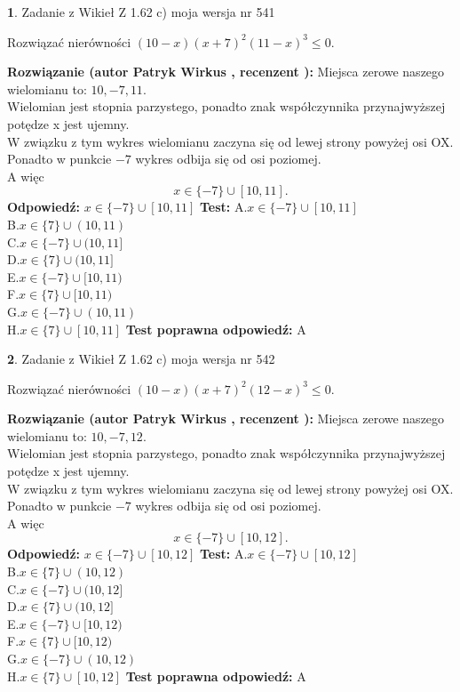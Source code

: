 \documentclass[12pt, a4paper]{article}
\theoremstyle{definition} %
\newtheorem{zad}{}
\newcommand{\zadStart}[1]{\begin{zad}#1\newline}
\newcommand{\zadStop}{\end{zad}}
\newcommand{\rozwStart}[2]{\noindent \textbf{Rozwiązanie (autor #1 , recenzent #2): }\newline}
\newcommand{\rozwStop}{\newline}
\newcommand{\odpStart}{\noindent \textbf{Odpowiedź:}\newline}
\newcommand{\odpStop}{\newline}
\newcommand{\testStart}{\noindent \textbf{Test:}\newline}
\newcommand{\testStop}{\newline}
\newcommand{\kluczStart}{\noindent \textbf{Test poprawna odpowiedź:}\newline}
\newcommand{\kluczStop}{\newline}
\begin{document}
\zadStart{Zadanie z Wikieł Z 1.62 c) moja wersja nr 541}

Rozwiązać nierówności $(10-x)(x+7)^{2}(11-x)^{3}\le0$.
\zadStop
\rozwStart{Patryk Wirkus}{}
Miejsca zerowe naszego wielomianu to: $10, -7, 11$.\\
Wielomian jest stopnia parzystego, ponadto znak współczynnika przy\linebreak najwyższej potędze x jest ujemny.\\ W związku z tym wykres wielomianu zaczyna się od lewej strony powyżej osi OX.\\
Ponadto w punkcie $-7$ wykres odbija się od osi poziomej.\\
A więc $$x \in \{-7\} \cup [10,11].$$
\rozwStop
\odpStart
$x \in \{-7\} \cup [10,11]$
\odpStop
\testStart
A.$x \in \{-7\} \cup [10,11]$\\
B.$x \in \{7\} \cup (10,11)$\\
C.$x \in \{-7\} \cup (10,11]$\\
D.$x \in \{7\} \cup (10,11]$\\
E.$x \in \{-7\} \cup [10,11)$\\
F.$x \in \{7\} \cup [10,11)$\\
G.$x \in \{-7\} \cup (10,11)$\\
H.$x \in \{7\} \cup [10,11]$
\testStop
\kluczStart
A
\kluczStop



\zadStart{Zadanie z Wikieł Z 1.62 c) moja wersja nr 542}

Rozwiązać nierówności $(10-x)(x+7)^{2}(12-x)^{3}\le0$.
\zadStop
\rozwStart{Patryk Wirkus}{}
Miejsca zerowe naszego wielomianu to: $10, -7, 12$.\\
Wielomian jest stopnia parzystego, ponadto znak współczynnika przy\linebreak najwyższej potędze x jest ujemny.\\ W związku z tym wykres wielomianu zaczyna się od lewej strony powyżej osi OX.\\
Ponadto w punkcie $-7$ wykres odbija się od osi poziomej.\\
A więc $$x \in \{-7\} \cup [10,12].$$
\rozwStop
\odpStart
$x \in \{-7\} \cup [10,12]$
\odpStop
\testStart
A.$x \in \{-7\} \cup [10,12]$\\
B.$x \in \{7\} \cup (10,12)$\\
C.$x \in \{-7\} \cup (10,12]$\\
D.$x \in \{7\} \cup (10,12]$\\
E.$x \in \{-7\} \cup [10,12)$\\
F.$x \in \{7\} \cup [10,12)$\\
G.$x \in \{-7\} \cup (10,12)$\\
H.$x \in \{7\} \cup [10,12]$
\testStop
\kluczStart
A
\kluczStop
\end{document}
